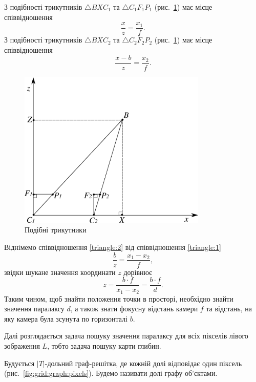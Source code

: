 З подібності трикутників $\triangle BXC_1$ та $\triangle C_1 F_1 P_1$
(рис.~\ref{fig:triangles}) має місце співвідношення
\begin{equation}
    \frac{x}{z} = \frac{x_1}{f}.
\end{equation} \label{triangle:1}
З подібності трикутників $\triangle BXC_2$ та $\triangle C_2 F_2 P_2$
(рис.~\ref{fig:triangles}) має місце співвідношення
\begin{equation} \label{triangle:2}
    \frac{x - b}{z} = \frac{x_2}{f}.
\end{equation}

\begin{figure}[h]
  \centering
  \includegraphics[width=0.8\textwidth]{images/2d_triangles}
  \caption{Подібні трикутники}
  \label{fig:triangles}
\end{figure}

Віднімемо співвідношення \eqref{triangle:2} від співвідношення
\eqref{triangle:1}
\begin{equation*}
    \frac{b}{z} = \frac{x_1 - x_2}{f},
\end{equation*}
звідки шукане значення координати $z$ дорівнює
\begin{equation*}
    z = \frac{b \cdot f}{x_1 - x_2} = \frac{b \cdot f}{d}.
\end{equation*}
Таким чином, щоб знайти положення точки в просторі,
необхідно знайти значення паралаксу $d$,
а також знати фокусну відстань камери $f$ та відстань,
на яку камера була зсунута по горизонталі $b$.

Далі розглядається задача пошуку значення паралаксу для всіх пікселів
лівого зображення $L$, тобто задача пошуку карти глибин.

Будується $\left| T \right|$-дольний граф-решітка,
де кожній долі відповідає один піксель (рис.~\ref{fig:grid:graph:pixels}).
Будемо називати долі графу об'єктами.

